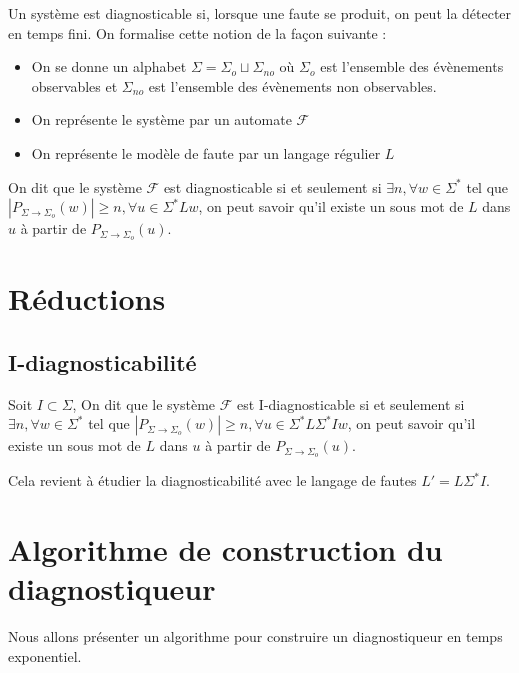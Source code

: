 \documentclass[10pt,a4paper]{article}
\begin{document}
Un syst\`eme est diagnosticable si, lorsque une faute se produit, on peut la détecter en temps fini. On formalise cette notion de la fa\c{c}on suivante :
\begin{itemize}
	\item On se donne un alphabet $\Sigma=\Sigma_o\sqcup\Sigma_{no}$ o\`u $\Sigma_o$ est l'ensemble des \'ev\`enements observables et $\Sigma_{no}$ est l'ensemble des \'ev\`enements non observables.
	\item On repr\'esente le syst\`eme par un automate $\mathcal F$
	\item On repr\'esente le mod\`ele de faute par un langage r\'egulier $L$
\end{itemize}

On dit que le système $\mathcal F$ est diagnosticable si et seulement si $\exists n, \forall w \in \Sigma^*$ tel que $|P_{\Sigma \to \Sigma_o}(w)| \geq n, \forall u \in \Sigma^* L w$, on peut savoir qu'il existe un sous mot de $L$ dans $u$ à partir de $P_{\Sigma \to \Sigma_o}(u)$. 


\section{R\'eductions}

\subsection{I-diagnosticabilit\'e}

Soit $I \subset \Sigma$, On dit que le système $\mathcal F$ est I-diagnosticable si et seulement si $\exists n, \forall w \in \Sigma^*$ tel que $|P_{\Sigma \to \Sigma_o}(w)| \geq n, \forall u \in \Sigma^* L \Sigma^* I w$, on peut savoir qu'il existe un sous mot de $L$ dans $u$ à partir de $P_{\Sigma \to \Sigma_o}(u)$. 

Cela revient à étudier la diagnosticabilité avec le langage de fautes $L'=L \Sigma^* I$.



\section{Algorithme de construction du diagnostiqueur}
    Nous allons présenter un algorithme pour construire un diagnostiqueur en temps exponentiel.
\end{document}
